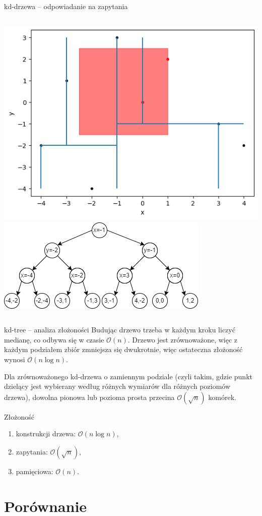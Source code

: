 \documentclass[aspectratio=169,dvipsnames]{beamer}
\newcommand{\sO}{\mathcal O}
\begin{document}
\begin{frame}{kd-drzewa -- odpowiadanie na zapytania}
    \begin{columns}
        \includegraphics[width=\textwidth]{images/plots/9}
        \includegraphics[width=\textwidth]{images/trees/12.drawio}
    \end{columns}
\end{frame}


\begin{frame}{kd-tree -- analiza złożoności}
    Budując drzewo trzeba w każdym kroku liczyć medianę, co odbywa się w czasie $\sO(n)$.
    Drzewo jest zrównoważone, więc z każdym podziałem zbiór zmniejsza się dwukrotnie,
    więc ostateczna złożoność wynosi $\sO(n \log n)$.

    \begin{lemma}[o kd-drzewie]
        Dla zrównoważonego kd-drzewa o zamiennym podziale (czyli takim, gdzie punkt dzielący jest wybierany według różnych wymiarów dla różnych poziomów drzewa), dowolna pionowa lub pozioma prosta przecina $\sO(\sqrt n)$ komórek.
    \end{lemma}

    Złożoność
    \begin{enumerate}
    \item konstrukcji drzewa: $\sO(n\log n)$,
    \item zapytania: $\sO(\sqrt n)$,
    \item pamięciowa: $\sO(n)$.
    \end{enumerate}
\end{frame}

\section{Porównanie}
\end{document}
